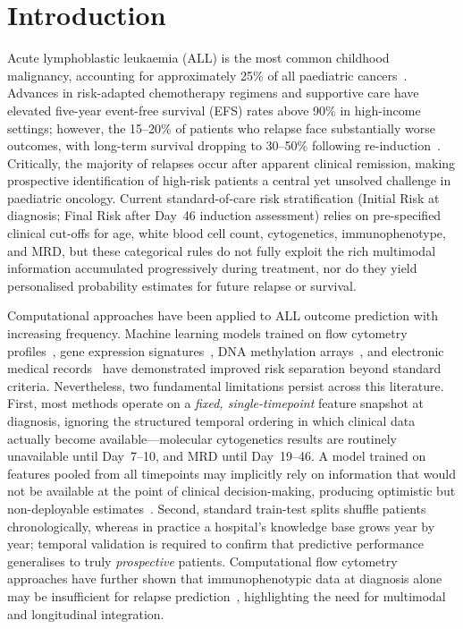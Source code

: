 \documentclass[pdflatex,sn-nature]{sn-jnl}
\begin{document}
\section{Introduction}\label{sec:intro}

Acute lymphoblastic leukaemia (ALL) is the most common childhood
malignancy, accounting for approximately 25\% of all paediatric
cancers~\cite{[CITE:Hunger2015]}. Advances in risk-adapted chemotherapy
regimens and supportive care have elevated five-year event-free
survival (EFS) rates above 90\% in high-income settings; however, the
15--20\% of patients who relapse face substantially worse outcomes,
with long-term survival dropping to 30--50\% following
re-induction~\cite{[CITE:Bhojwani2013],[CITE:Pui2008]}.
Critically, the majority of relapses occur after apparent clinical
remission, making prospective identification of high-risk patients
a central yet unsolved challenge in paediatric oncology.
Current standard-of-care risk stratification (Initial Risk at
diagnosis; Final Risk after Day~46 induction assessment) relies on
pre-specified clinical cut-offs for age, white blood cell count,
cytogenetics, immunophenotype, and MRD, but these categorical rules do
not fully exploit the rich multimodal information accumulated
progressively during treatment, nor do they yield personalised
probability estimates for future relapse or survival.

Computational approaches have been applied to ALL outcome prediction
with increasing frequency. Machine learning models trained on flow
cytometry profiles~\cite{[CITE:Good2018]}, gene expression
signatures~\cite{[CITE:Fitter2021]}, DNA methylation
arrays~\cite{[CITE:Mosquera2024]}, and electronic medical
records~\cite{[CITE:Pan2017]} have demonstrated improved risk
separation beyond standard criteria.
Nevertheless, two fundamental limitations persist across this
literature.
First, most methods operate on a \emph{fixed, single-timepoint}
feature snapshot at diagnosis, ignoring the structured temporal
ordering in which clinical data actually become available—molecular
cytogenetics results are routinely unavailable until Day~7--10, and
MRD until Day~19--46.
A model trained on features pooled from all timepoints may implicitly
rely on information that would not be available at the point of
clinical decision-making, producing optimistic but
non-deployable estimates~\cite{[CITE:Steyerberg2019]}.
Second, standard train-test splits shuffle patients
chronologically, whereas in practice a hospital's knowledge base
grows year by year; temporal validation is required to confirm
that predictive performance generalises to truly \emph{prospective}
patients.
Computational flow cytometry approaches have further shown that
immunophenotypic data at diagnosis alone may be insufficient for
relapse prediction~\cite{[CITE:Martinez2025]}, highlighting the need
for multimodal and longitudinal integration.
\end{document}
